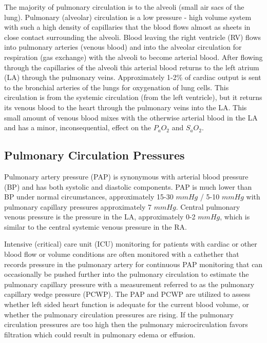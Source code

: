 The majority of pulmonary circulation is to the alveoli (small air sacs of the lung). Pulmonary (alveolar) circulation is a low pressure - high volume system with such a high density of capillaries that the blood flows almost as sheets in close contact surrounding the alveoli. Blood leaving the right ventricle (RV) flows into pulmonary arteries (venous blood) and into the alveolar circulation for respiration (gas exchange) with the alveoli to become arterial blood. After flowing through the capillaries of the alveoli this arterial blood returns to the left atrium (LA) through the pulmonary veins. 
Approximately 1-2\% of cardiac output is sent to the bronchial arteries of the lungs for oxygenation of lung cells. This circulation is from the systemic circulation (from the left ventricle), but it returns its venous blood to the heart through the pulmonary veins into the LA. This small amount of venous blood mixes with the otherwise arterial blood in the LA and has a minor, inconsequential, effect on the $P_aO_2$ and $S_aO_2$.

\subsection{Pulmonary Circulation Pressures}

Pulmonary artery pressure (PAP) is synonymous with arterial blood pressure (BP) and has both systolic and diastolic components. PAP is much lower than BP under normal circumstances, approximately 15-30 $mmHg$ / 5-10 $mmHg$ with pulmonary capillary pressures approximately 7 $mmHg$. Central pulmonary venous pressure is the pressure in the LA, approximately 0-2 $mmHg$, which is similar to the central systemic venous pressure in the RA. 

Intensive (critical) care unit (ICU) monitoring for patients with cardiac or other blood flow or volume conditions are often monitored with a cathether that records pressure in the pulmonary artery for continuous PAP monitoring that can occasionally be pushed further into the pulmonary circulation to estimate the pulmonary capillary pressure with a measurement referred to as the pulmonary capillary wedge pressure (PCWP). The PAP and PCWP are utilized to assess whether left sided heart function is adequate for the current blood volume, or whether the pulmonary circulation pressures are rising. If the pulmonary circulation pressures are too high then the pulmonary microcirculation favors filtration which could result in pulmonary edema or effusion.

